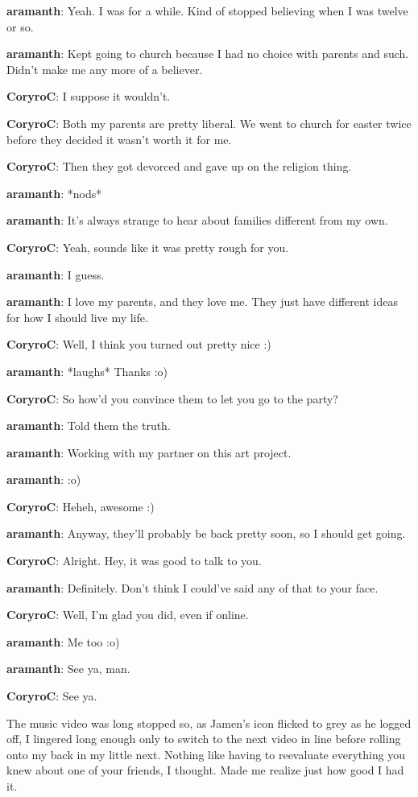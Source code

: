 \textbf{\color{red}aramanth}: Yeah.  I was for a while.  Kind of stopped believing when I was twelve or so.

\textbf{\color{red}aramanth}: Kept going to church because I had no choice with parents and such.  Didn't make me any more of a believer.

\textbf{\color{blue}CoryroC}: I suppose it wouldn't.

\textbf{\color{blue}CoryroC}: Both my parents are pretty liberal.  We went to church for easter twice before they decided it wasn't worth it for me.

\textbf{\color{blue}CoryroC}: Then they got devorced and gave up on the religion thing.

\textbf{\color{red}aramanth}: *nods*

\textbf{\color{red}aramanth}: It's always strange to hear about families different from my own.

\textbf{\color{blue}CoryroC}: Yeah, sounds like it was pretty rough for you.

\textbf{\color{red}aramanth}: I guess.

\textbf{\color{red}aramanth}: I love my parents, and they love me.  They just have different ideas for how I should live my life.

\textbf{\color{blue}CoryroC}: Well, I think you turned out pretty nice :)

\textbf{\color{red}aramanth}: *laughs* Thanks :o)

\textbf{\color{blue}CoryroC}: So how'd you convince them to let you go to the party?

\textbf{\color{red}aramanth}: Told them the truth.

\textbf{\color{red}aramanth}: Working with my partner on this art project.

\textbf{\color{red}aramanth}: :o)

\textbf{\color{blue}CoryroC}: Heheh, awesome :)

\textbf{\color{red}aramanth}: Anyway, they'll probably be back pretty soon, so I should get going.

\textbf{\color{blue}CoryroC}: Alright.  Hey, it was good to talk to you.

\textbf{\color{red}aramanth}: Definitely.  Don't think I could've said any of that to your face.

\textbf{\color{blue}CoryroC}: Well, I'm glad you did, even if online.

\textbf{\color{red}aramanth}: Me too :o)

\textbf{\color{red}aramanth}: See ya, man.

\textbf{\color{blue}CoryroC}: See ya.

\vspace{1em}The music video was long stopped so, as Jamen's icon flicked to grey as he logged off, I lingered long enough only to switch to the next video in line before rolling onto my back in my little next.  Nothing like having to reevaluate everything you knew about one of your friends, I thought.  Made me realize just how good I had it.
